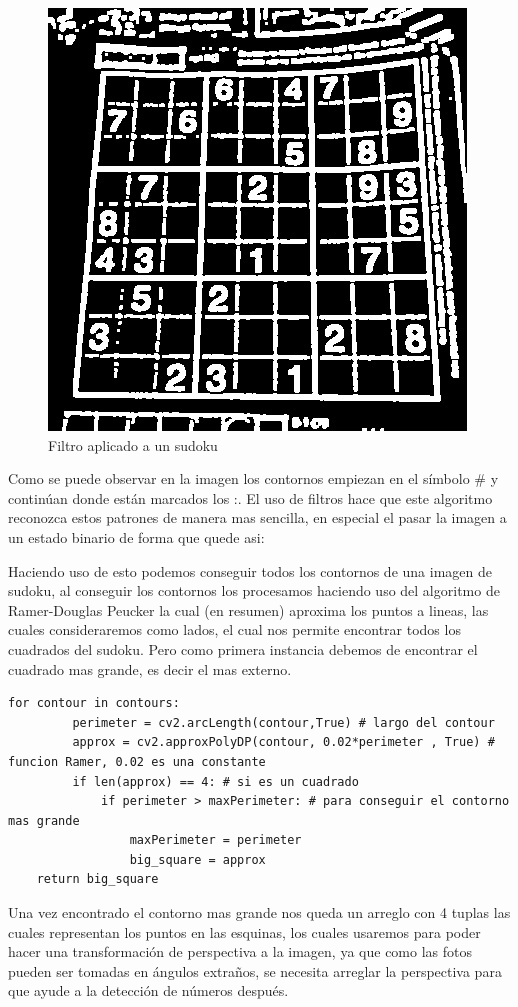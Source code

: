 \documentclass{article}
\begin{document}
\begin{figure}
\includegraphics[width=1\linewidth]{filtro}
\caption{Filtro aplicado a un sudoku}
\end{figure}
Como se puede observar en la imagen los contornos empiezan en el símbolo \# y continúan donde están marcados los
:. El uso de filtros hace que este algoritmo reconozca estos patrones de manera mas sencilla, en especial el 
pasar la imagen a un estado binario de forma que quede asi:

Haciendo uso de esto podemos conseguir todos los contornos de una imagen de sudoku, al conseguir los contornos
los procesamos haciendo uso del algoritmo de Ramer-Douglas Peucker \cite{ramer} la cual (en resumen) aproxima los puntos
a lineas, las cuales consideraremos como lados, el cual nos permite encontrar todos los cuadrados del sudoku.
Pero como primera instancia debemos de encontrar el cuadrado mas grande, es decir el mas externo.
\vspace{.3cm}
\begin{lstlisting}[style=pythonStyle]
for contour in contours:
         perimeter = cv2.arcLength(contour,True) # largo del contour
         approx = cv2.approxPolyDP(contour, 0.02*perimeter , True) # funcion Ramer, 0.02 es una constante
         if len(approx) == 4: # si es un cuadrado
             if perimeter > maxPerimeter: # para conseguir el contorno mas grande
                 maxPerimeter = perimeter
                 big_square = approx
    return big_square
\end{lstlisting}
Una vez encontrado el contorno mas grande nos queda un arreglo con 4 tuplas las cuales representan los puntos
en las esquinas, los cuales usaremos para poder hacer una transformación de perspectiva a la imagen, ya que
como las fotos pueden ser tomadas en ángulos extraños, se necesita arreglar la perspectiva para que ayude a la
detección de números después.
\end{document}
